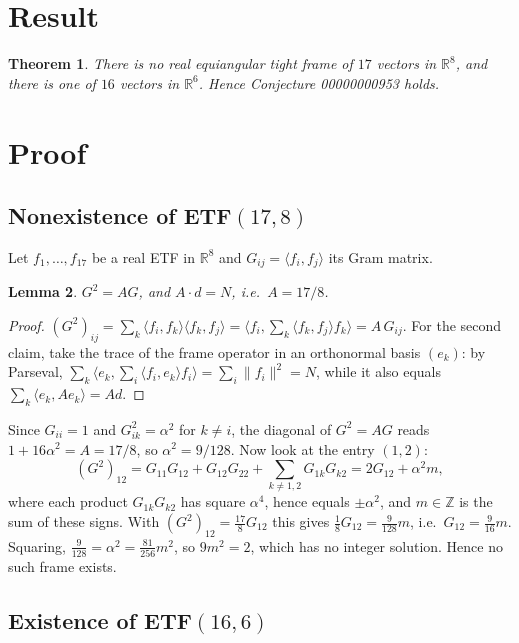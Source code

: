\documentclass[11pt]{article}
\theoremstyle{plain}
\newtheorem{theorem}{Theorem}
\newtheorem{lemma}[theorem]{Lemma}
\theoremstyle{definition}
\theoremstyle{remark}
\newcommand{\ip}[2]{\langle #1,#2\rangle}
\begin{document}
\section{Result}

\begin{theorem}\label{thm:main}
There is no real equiangular tight frame of $17$ vectors in $\mathbb R^8$, and
there is one of $16$ vectors in $\mathbb R^6$. Hence Conjecture 00000000953
holds.
\end{theorem}

\section{Proof}

\subsection{Nonexistence of ETF$(17,8)$}

Let $f_1,\ldots,f_{17}$ be a real ETF in $\mathbb R^8$ and
$G_{ij}=\ip{f_i}{f_j}$ its Gram matrix.

\begin{lemma}\label{lem:gram}
$G^2=AG$, and $A\cdot d=N$, i.e.\ $A=17/8$.
\end{lemma}

\begin{proof}
$(G^2)_{ij}=\sum_k\ip{f_i}{f_k}\ip{f_k}{f_j}
=\ip{f_i}{\sum_k\ip{f_k}{f_j}f_k}=A\,G_{ij}$. For the second claim, take the
trace of the frame operator in an orthonormal basis $(e_k)$: by Parseval,
$\sum_k\ip{e_k}{\sum_i\ip{f_i}{e_k}f_i}=\sum_i\|f_i\|^2=N$, while it also equals
$\sum_k\ip{e_k}{Ae_k}=Ad$.
\end{proof}

Since $G_{ii}=1$ and $G_{ik}^2=\alpha^2$ for $k\ne i$, the diagonal of
$G^2=AG$ reads $1+16\alpha^2=A=17/8$, so $\alpha^2=9/128$. Now look at the entry
$(1,2)$:
\[
  (G^2)_{12}=G_{11}G_{12}+G_{12}G_{22}+\sum_{k\ne1,2}G_{1k}G_{k2}
  =2G_{12}+\alpha^2m ,
\]
where each product $G_{1k}G_{k2}$ has square $\alpha^4$, hence equals
$\pm\alpha^2$, and $m\in\mathbb Z$ is the sum of these signs. With
$(G^2)_{12}=\frac{17}8G_{12}$ this gives $\frac18G_{12}=\frac9{128}m$, i.e.\
$G_{12}=\frac9{16}m$. Squaring, $\frac{9}{128}=\alpha^2=\frac{81}{256}m^2$, so
$9m^2=2$, which has no integer solution. Hence no such frame exists.

\subsection{Existence of ETF$(16,6)$}
\end{document}
